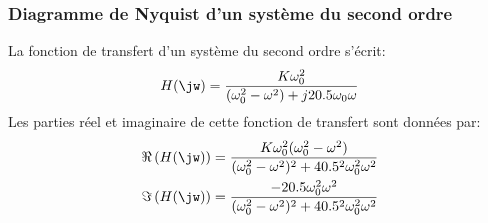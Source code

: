 \subsubsection{Diagramme de Nyquist d'un système du second ordre}
La fonction de transfert d'un système du second ordre s'écrit:
$$
H(\jw)=\dfrac{K\omega_0^2}{(\omega_0^2-\omega^2)+j2\xi\omega_0\omega}
$$
Les parties réel et imaginaire de cette fonction de transfert sont données par:
\begin{align*}
    \Re\left(H(\jw)\right)&=\dfrac{K\omega_0^2(\omega_0^2-\omega^2)}{(\omega_0^2-\omega^2)^2+4\xi^2\omega_0^2\omega^2}\\
    \Im\left(H(\jw)\right)&=\dfrac{-2\xi\omega_0^2\omega^2}{(\omega_0^2-\omega^2)^2+4\xi^2\omega_0^2\omega^2}\\
\end{align*}
